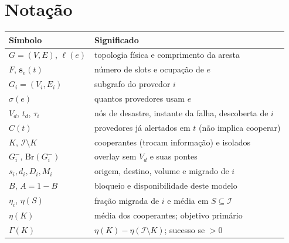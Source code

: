 \documentclass[11pt,a4paper]{article}
\theoremstyle{definition}
\begin{document}
\section{Notação}

\begin{center}
\small
\begin{tabular}{@{}ll@{}}
\toprule
Símbolo & Significado \\
\midrule
$G=(V,E)$, $\ell(e)$ & topologia física e comprimento da aresta \\
$F$, $\mathbf{s}_e(t)$ & número de slots e ocupação de $e$ \\
$G_i=(V_i,E_i)$ & subgrafo do provedor $i$ \\
$\sigma(e)$ & quantos provedores usam $e$ \\
$V_d$, $t_d$, $\tau_i$ & nós de desastre, instante da falha, descoberta de $i$ \\
$C(t)$ & provedores já alertados em $t$ (não implica cooperar) \\
$K$, $\mathcal{I}\setminus K$ & cooperantes (trocam informação) e isolados \\
$G_i^{-}$, $\mathrm{Br}(G_i^{-})$ & overlay sem $V_d$ e suas pontes \\
$s_i,d_i,D_i,M_i$ & origem, destino, volume e migrado de $i$ \\
$B$, $A=1-B$ & bloqueio e disponibilidade deste modelo \\
$\eta_i$, $\eta(S)$ & fração migrada de $i$ e média em $S\subseteq\mathcal{I}$ \\
$\eta(K)$ & média dos cooperantes; objetivo primário \\
$\Gamma(K)$ & $\eta(K)-\eta(\mathcal{I}\setminus K)$; sucesso se $>0$ \\
\bottomrule
\end{tabular}
\end{center}
\end{document}
